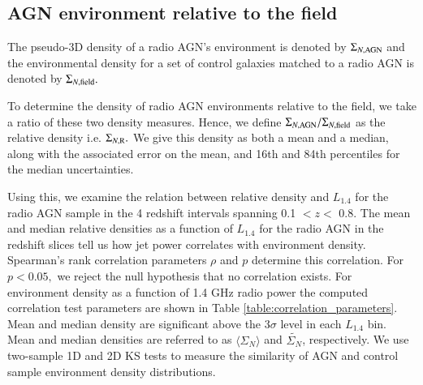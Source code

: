 \subsection{AGN environment relative to the field} 
The pseudo-3D density of a radio AGN's environment is denoted by $\Sigma_{N,\rm{AGN}}$ and the environmental density for a set of control galaxies matched to a radio AGN is denoted by $\Sigma_{N,\rm{field}}.$

To determine the density of radio AGN environments relative to the field, we take a ratio of these two density measures. Hence, we define $\Sigma_{N,\rm{AGN}}/\Sigma_{N,\rm{field}}$ as the relative density i.e. $\Sigma_{N,\rm{R}}.$ We give this density as both a mean and a median, along with the associated error on the mean, and 16th and 84th percentiles for the median uncertainties. 

Using this, we examine the relation between relative density and $L_{1.4}$ for the radio AGN sample in the 4 redshift intervals spanning 0.1 $< z <$ 0.8. The mean and median relative densities as a function of $L_{1.4}$ for the radio AGN in the redshift slices tell us how jet power correlates with environment density. Spearman's rank correlation parameters $\rho$ and $p$ determine this correlation. For $p < 0.05,$ we reject the null hypothesis that no correlation exists. For environment density as a function of 1.4 GHz radio power the computed correlation test parameters are shown in Table \ref{table:correlation_parameters}. Mean and median density are significant above the $3\sigma$ level in each $L_{1.4}$ bin. Mean and median densities are referred to as $\langle \Sigma_{N} \rangle$ and $\widetilde{\Sigma_{N}}$, respectively. We use two-sample 1D and 2D KS tests to measure the similarity of AGN and control sample environment density distributions. 

